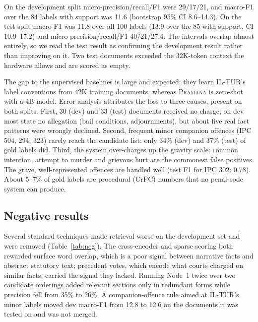 \documentclass[conference]{IEEEtran}
\newcommand{\sys}{\textsc{Pramana}\xspace}
\newcommand{\testmacro}{11.8}
\newcommand{\testmicro}{27.4}
\begin{document}
On the development split micro-precision/recall/F1 were 29/17/21, and macro-F1 over the 84 labels with support was 11.6 (bootstrap 95\% CI 8.6--14.3). On the test split macro-F1 was \testmacro{} over all 100 labels (13.9 over the 85 with support, CI 10.9--17.2) and micro-precision/recall/F1 40/21/\testmicro. The intervals overlap almost entirely, so we read the test result as confirming the development result rather than improving on it. Two test documents exceeded the 32K-token context the hardware allows and are scored as empty.

The gap to the supervised baselines is large and expected: they learn IL-TUR's label conventions from 42K training documents, whereas \sys is zero-shot with a 4B model. Error analysis attributes the loss to three causes, present on both splits. First, 30 (dev) and 33 (test) documents received no charge; on dev most state no allegation (bail conditions, adjournments), but about five real fact patterns were wrongly declined. Second, frequent minor companion offences (IPC 504, 294, 323) rarely reach the candidate list: only 34\% (dev) and 37\% (test) of gold labels did. Third, the system over-charges up the gravity scale: common intention, attempt to murder and grievous hurt are the commonest false positives. The grave, well-represented offences are handled well (test F1 for IPC 302: 0.78). About 5--7\% of gold labels are procedural (CrPC) numbers that no penal-code system can produce.

\subsection{Negative results}
Several standard techniques made retrieval worse on the development set and were removed (Table~\ref{tab:neg}). The cross-encoder and sparse scoring both rewarded surface word overlap, which is a poor signal between narrative facts and abstract statutory text; precedent votes, which encode what courts charged on similar facts, carried the signal they lacked. Running Node~1 twice over two candidate orderings added relevant sections only in redundant forms while precision fell from 35\% to 26\%. A companion-offence rule aimed at IL-TUR's minor labels moved dev macro-F1 from 12.8 to 12.6 on the documents it was tested on and was not merged.
\end{document}
